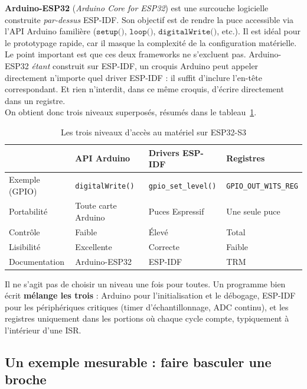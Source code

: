 \textbf{Arduino-ESP32} (\textit{Arduino Core for ESP32}) est une surcouche logicielle construite \textit{par-dessus} ESP-IDF. Son objectif est de rendre la puce accessible via l'API Arduino familière ($\texttt{setup()}$, $\texttt{loop()}$, $\texttt{digitalWrite()}$, etc.). Il est idéal pour le prototypage rapide, car il masque la complexité de la configuration matérielle.\\

Le point important est que ces deux frameworks ne s'excluent pas. Arduino-ESP32 \textit{étant} construit sur ESP-IDF, un croquis Arduino peut appeler directement n'importe quel driver ESP-IDF : il suffit d'inclure l'en-tête correspondant. Et rien n'interdit, dans ce même croquis, d'écrire directement dans un registre.\\

On obtient donc trois niveaux superposés, résumés dans le tableau~\ref{tab:niveaux}.

\begin{table}[!h]
\centering
\renewcommand{\arraystretch}{1.3}
\begin{tabular}{|p{3.1cm}|p{3.4cm}|p{3.4cm}|p{3.4cm}|}
\hline
 & \textbf{API Arduino} & \textbf{Drivers ESP-IDF} & \textbf{Registres} \\
\hline
Exemple (GPIO) & \texttt{digitalWrite()} & \texttt{gpio\_set\_level()} & \texttt{GPIO\_OUT\_W1TS\_REG} \\
\hline
Portabilité & Toute carte Arduino & Puces Espressif & Une seule puce \\
\hline
Contrôle & Faible & Élevé & Total \\
\hline
Lisibilité & Excellente & Correcte & Faible \\
\hline
Documentation & Arduino-ESP32 & ESP-IDF & TRM \\
\hline
\end{tabular}
\caption{Les trois niveaux d'accès au matériel sur ESP32-S3}
\label{tab:niveaux}
\end{table}

\begin{imp}
Il ne s'agit pas de choisir un niveau une fois pour toutes. Un programme bien écrit \textbf{mélange les trois} : Arduino pour l'initialisation et le débogage, ESP-IDF pour les périphériques critiques (timer d'échantillonnage, ADC continu), et les registres uniquement dans les portions où chaque cycle compte, typiquement à l'intérieur d'une ISR.
\end{imp}

\subsection{Un exemple mesurable : faire basculer une broche}

